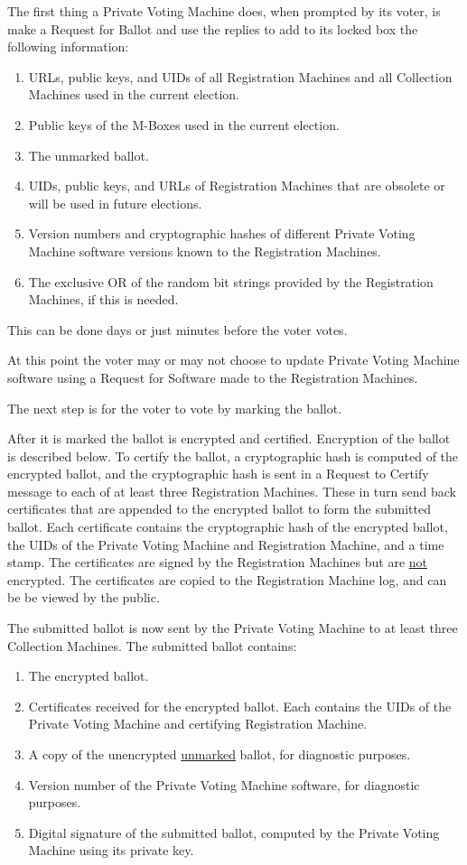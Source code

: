 \documentclass[12pt]{article}
\begin{document}
The first thing a Private Voting Machine does, when prompted by
its voter, is make a Request for Ballot and use the replies to
add to its locked box the following information:
\begin{enumerate}
\setcounter{enumi}{\value{PVM-COUNTER}}
\item URLs, public keys, and UIDs
of all Registration Machines and all Collection
Machines used in the current election.
\item Public keys of the M-Boxes used in the current election.
\item The unmarked ballot.
\item UIDs, public keys, and URLs of Registration Machines that are
obsolete or will be used in future elections.
\item Version numbers and cryptographic hashes of different Private
Voting Machine software versions known to the Registration Machines.
\item The exclusive OR of the random bit strings provided by the
Registration Machines, if this is needed.
\end{enumerate}
This can be done days or just minutes before the voter votes.

At this point
the voter may or may not choose to update Private Voting Machine
software using a Request for Software made to the Registration Machines.

The next step is for the voter to vote by marking the ballot.

After it is marked the ballot is encrypted and certified.  Encryption of the
ballot is described below.  To certify the ballot, a cryptographic hash
is computed of the encrypted ballot, and the cryptographic hash is sent
in a Request to Certify message to each of at least three Registration
Machines.  These in turn send back certificates that are appended
to the encrypted ballot to form the submitted ballot.  Each
certificate contains the cryptographic hash of the encrypted ballot, the
UIDs of the Private Voting Machine and Registration Machine,
and a time stamp.  The certificates
are signed by the Registration Machines but are \underline{not} encrypted.
The certificates are copied to the Registration Machine log, and can be
be viewed by the public.

The submitted ballot is now sent by the Private Voting
Machine to at least three Collection Machines.  The submitted
ballot contains:
\begin{enumerate}
\item The encrypted ballot.
\item Certificates received for the encrypted ballot.  Each contains the
UIDs of the Private Voting Machine and certifying Registration Machine.
\item A copy of the unencrypted \underline{unmarked} ballot, for
diagnostic purposes.
\item Version number of the Private Voting Machine software, for
diagnostic purposes.
\item Digital signature of the submitted ballot, computed by the
Private Voting Machine using its private key.
\end{enumerate}
\end{document}
